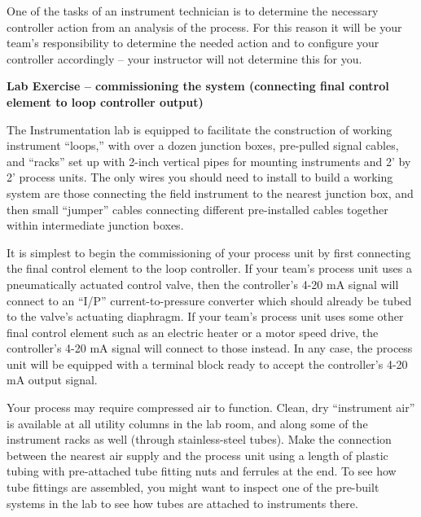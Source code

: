 \vskip 10pt

One of the tasks of an instrument technician is to determine the necessary controller action from an analysis of the process.  For this reason it will be your team's responsibility to determine the needed action and to configure your controller accordingly -- your instructor will not determine this for you.











\vfil \eject

\noindent
{\bf Lab Exercise -- commissioning the system (connecting final control element to loop controller output)}

\vskip 5pt

The Instrumentation lab is equipped to facilitate the construction of working instrument ``loops,'' with over a dozen junction boxes, pre-pulled signal cables, and ``racks'' set up with 2-inch vertical pipes for mounting instruments and 2' by 2' process units.  The only wires you should need to install to build a working system are those connecting the field instrument to the nearest junction box, and then small ``jumper'' cables connecting different pre-installed cables together within intermediate junction boxes.

It is simplest to begin the commissioning of your process unit by first connecting the final control element to the loop controller.  If your team's process unit uses a pneumatically actuated control valve, then the controller's 4-20 mA signal will connect to an ``I/P'' current-to-pressure converter which should already be tubed to the valve's actuating diaphragm.  If your team's process unit uses some other final control element such as an electric heater or a motor speed drive, the controller's 4-20 mA signal will connect to those instead.  In any case, the process unit will be equipped with a terminal block ready to accept the controller's 4-20 mA output signal.

Your process may require compressed air to function.  Clean, dry ``instrument air'' is available at all utility columns in the lab room, and along some of the instrument racks as well (through stainless-steel tubes).  Make the connection between the nearest air supply and the process unit using a length of plastic tubing with pre-attached tube fitting nuts and ferrules at the end.  To see how tube fittings are assembled, you might want to inspect one of the pre-built systems in the lab to see how tubes are attached to instruments there.

